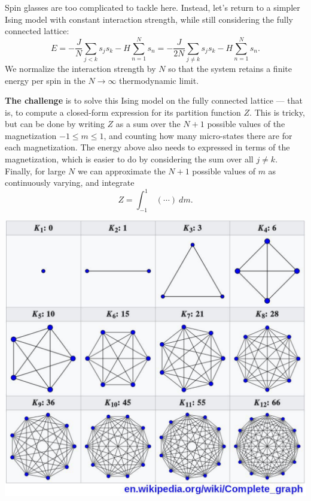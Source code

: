 \documentclass[12 pt]{article} %
\begin{document}
Spin glasses are too complicated to tackle here.
Instead, let's return to a simpler Ising model with constant interaction strength, while still considering the fully connected lattice:
\begin{equation*}
  E = -\frac{J}{N} \sum_{j < k} s_j s_k - H \sum_{n = 1}^N s_n = -\frac{J}{2N} \sum_{j \neq k} s_j s_k - H \sum_{n = 1}^N s_n.
\end{equation*}
We normalize the interaction strength by $N$ so that the system retains a finite energy per spin in the $N \to \infty$ thermodynamic limit.

\textbf{The challenge} is to solve this Ising model on the fully connected lattice --- that is, to compute a closed-form expression for its partition function $Z$.
This is tricky, but can be done by writing $Z$ as a sum over the $N + 1$ possible values of the magnetization $-1 \leq m \leq 1$, and counting how many micro-states there are for each magnetization.
The energy above also needs to expressed in terms of the magnetization, which is easier to do by considering the sum over all $j \neq k$.
Finally, for large $N$ we can approximate the $N + 1$ possible values of $m$ as continuously varying, and integrate
\begin{equation*}
  Z = \int_{-1}^1 \ (\cdots) \ dm.
\end{equation*}

\begin{center}\includegraphics[width=\textwidth]{figs/completeGraph.pdf}\end{center}
\end{document}
